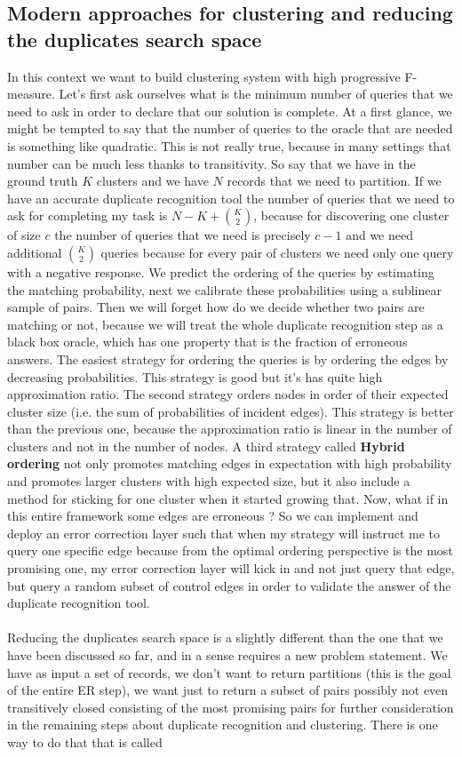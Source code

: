 \documentclass[11pt]{article}
\begin{document}
\subsection{Modern approaches for clustering and reducing the duplicates search space}
In this context we want to build clustering system with high progressive F-measure. Let's first ask ourselves what is the minimum number of queries that we need to ask in order to declare that our solution is complete. At a first glance, we might be tempted to say that the number of queries to the oracle that are needed is something like quadratic. This is not really true, because in many settings that number can be much less thanks to transitivity. So say that we have in the ground truth $K$ clusters and we have $N$ records that we need to partition. If we have an accurate duplicate recognition tool the number of queries that we need to ask for completing my task is $N - K + {K \choose 2}$, because for discovering one cluster of size $c$ the number of queries that we need is precisely $c - 1$ and we need additional ${K \choose 2}$ queries because for every pair of clusters we need only one query with a negative response. We predict the ordering of the queries by estimating the matching probability, next we calibrate these probabilities using a sublinear sample of pairs. Then we will forget how do we decide whether two pairs are matching or not, because we will treat the whole duplicate recognition step as a black box oracle, which has one property that is the fraction of erroneous answers. The easiest strategy for ordering the queries is by ordering the edges by decreasing probabilities. This strategy is good but it's has quite high approximation ratio. The second strategy orders nodes in order of their expected cluster size (i.e. the sum of probabilities of incident edges). This strategy is better than the previous one, because the approximation ratio is linear in the number of clusters and not in the number of nodes. A third strategy called \textbf{Hybrid ordering} not only promotes matching edges in expectation with high probability and promotes larger clusters with high expected size, but it also include a method for sticking for one cluster when it started growing that. Now, what if in this entire framework some edges are erroneous ? So we can implement and deploy an error correction layer such that when my strategy will instruct me to query one specific edge because from the optimal ordering perspective is the most promising one, my error correction layer will kick in and not just query that edge, but query a random subset of control edges in order to validate the answer of the duplicate recognition tool.\\\\Reducing the duplicates search space is a slightly different than the one that we have been discussed so far, and in a sense requires a new problem statement. We have as input a set of records, we don't want to return partitions (this is the goal of the entire ER step), we want just to return a subset of pairs possibly not even transitively closed consisting of the most promising pairs for further consideration in the remaining steps about duplicate recognition and clustering. There is one way to do that that is called 
\end{document}
